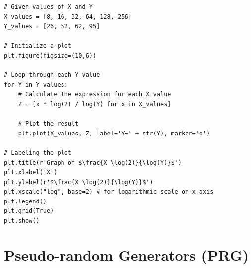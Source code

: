 \documentclass[12pt,openany]{book}
\theoremstyle{definition}
\begin{document}
\begin{itemize}
\begin{lstlisting}[style=sage]
# Given values of X and Y
X_values = [8, 16, 32, 64, 128, 256]
Y_values = [26, 52, 62, 95]

# Initialize a plot
plt.figure(figsize=(10,6))

# Loop through each Y value
for Y in Y_values:
	# Calculate the expression for each X value
	Z = [x * log(2) / log(Y) for x in X_values]
	
	# Plot the result
	plt.plot(X_values, Z, label='Y=' + str(Y), marker='o')

# Labeling the plot
plt.title(r'Graph of $\frac{X \log(2)}{\log(Y)}$')
plt.xlabel('X')
plt.ylabel(r'$\frac{X \log(2)}{\log(Y)}$')
plt.xscale("log", base=2) # for logarithmic scale on x-axis
plt.legend()
plt.grid(True)
plt.show()
\end{lstlisting}
	\end{itemize}

	\newpage
	\chapter{Pseudo-random Generators (PRG)}
	
\end{document}
